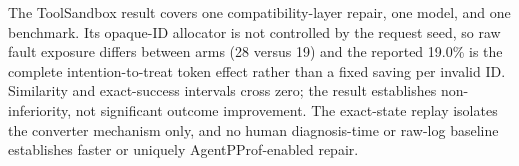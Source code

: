 \documentclass[letterpaper]{article}
\begin{document}
The ToolSandbox result covers one compatibility-layer repair, one model, and
one benchmark. Its opaque-ID allocator is not controlled by the request seed,
so raw fault exposure differs between arms (28 versus 19) and the reported
19.0\% is the complete intention-to-treat token effect rather than a fixed
saving per invalid ID. Similarity and exact-success intervals cross zero;
the result establishes non-inferiority, not significant outcome improvement.
The exact-state replay isolates the converter mechanism only, and no human
diagnosis-time or raw-log baseline establishes faster or uniquely
AgentPProf-enabled repair.
\end{document}
